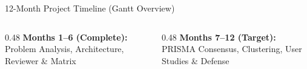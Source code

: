 \documentclass[aspectratio=169,10pt]{beamer}
\begin{document}
\begin{frame}{12-Month Project Timeline (Gantt Overview)}

\vspace{0.35cm}
\begin{columns}[T]
  \begin{column}{0.48\textwidth}
    {\fontsize{7pt}{9pt}\selectfont\color{AccentGreen}
    \textbf{ Months 1--6 (Complete):} Problem Analysis, Architecture, Reviewer \& Matrix}
  \end{column}
  \begin{column}{0.48\textwidth}
    {\fontsize{7pt}{9pt}\selectfont\color{DarkText}
    \textbf{ Months 7--12 (Target):} PRISMA Consensus, Clustering, User Studies \& Defense}
  \end{column}
\end{columns}
\end{frame}
\end{document}
